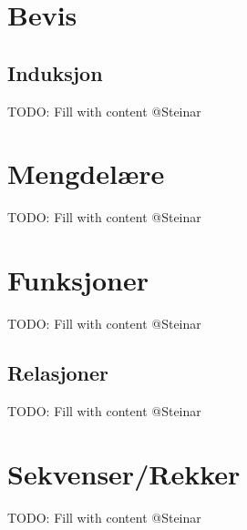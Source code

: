 \section{Bevis}

\subsection{Induksjon}
\begin{frame}
TODO: Fill with content @Steinar 
\end{frame}

\section{Mengdelære}
\begin{frame}
TODO: Fill with content @Steinar 
\end{frame}

\section{Funksjoner}
\begin{frame}
TODO: Fill with content @Steinar 
\end{frame}

\subsection{Relasjoner}
\begin{frame}
TODO: Fill with content @Steinar 
\end{frame}

\section{Sekvenser/Rekker}
\begin{frame}
TODO: Fill with content @Steinar 
\end{frame}